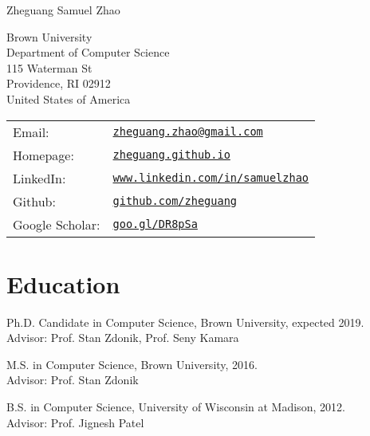 \documentclass[letterpaper]{article}
\def\name{Zheguang Samuel Zhao}
\renewenvironment{itemize}{
  \begin{list}{}{
    \setlength{\leftmargin}{1.5em}
  }
}{
  \end{list}
}
\begin{document}
{\huge \name}


\vspace{0.25in}

\begin{minipage}{0.45\linewidth}
  Brown University \\
  Department of Computer Science \\
  115 Waterman St \\
  Providence, RI 02912 \\
  United States of America
\end{minipage}
\begin{minipage}{0.45\linewidth}
  \begin{tabular}{ll}
    Email: & \href{mailto:zheguang.zhao@gmail.com}{\tt zheguang.zhao@gmail.com} \\
    Homepage: & \href{https://zheguang.github.io}{\tt zheguang.github.io} \\
    LinkedIn: & \href{https://www.linkedin.com/in/samuelzhao}{\tt www.linkedin.com/in/samuelzhao} \\
    Github: & \href{https://github.com/zheguang}{\tt github.com/zheguang} \\
    Google Scholar: & \href{https://goo.gl/DR8pSa}{\tt goo.gl/DR8pSa} \\
  \end{tabular}
\end{minipage}

\section*{Education}

\begin{itemize}
  \item Ph.D. Candidate in Computer Science, Brown University, expected 2019.\\
  Advisor: Prof. Stan Zdonik, Prof. Seny Kamara
  \item M.S. in Computer Science, Brown University, 2016.\\
  Advisor: Prof. Stan Zdonik
  \item B.S. in Computer Science, University of Wisconsin at Madison, 2012.\\
  Advisor: Prof. Jignesh Patel
\end{itemize}
\end{document}
